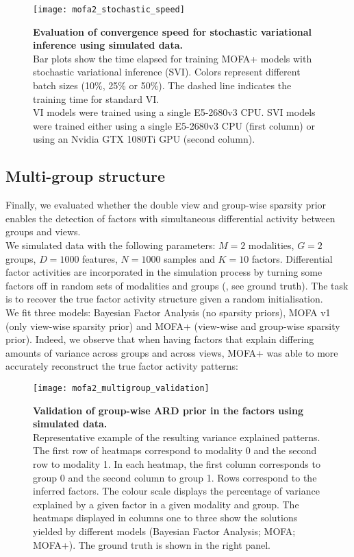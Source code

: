 \begin{figure}[H]
	\centering
	\texttt{[image: mofa2\_stochastic\_speed]}
	\caption[]{
	\textbf{Evaluation of convergence speed for stochastic variational inference using simulated data.} \\
	Bar plots show the time elapsed for training MOFA+ models with  stochastic variational inference (SVI). Colors represent different batch sizes (10\%, 25\% or 50\%). The dashed line indicates the training time for standard VI.\\
	VI models were trained using a single E5-2680v3 CPU. SVI models were trained either using a single E5-2680v3 CPU (first column) or using an Nvidia GTX 1080Ti GPU (second column). 
	}
	\label{fig:mofa2_stochastic_speed}
\end{figure}



\subsection{Multi-group structure}

Finally, we evaluated whether the double view and group-wise sparsity prior enables the detection of factors with simultaneous differential activity between groups and views.\\
We simulated data with the following parameters: $M=2$ modalities, $G=2$ groups, $D=1000$ features, $N=1000$ samples and $K=10$ factors. Differential factor activities are incorporated in the simulation process by turning some factors off in random sets of modalities and groups (, see ground truth). The task is to recover the true factor activity structure given a random initialisation.\\
We fit three models: Bayesian Factor Analysis (no sparsity priors), MOFA v1 (only view-wise sparsity prior) and MOFA+ (view-wise and group-wise sparsity prior). 
Indeed, we observe that when having factors that explain differing amounts of variance across groups and across views, MOFA+ was able to more accurately reconstruct the true factor activity patterns:

\begin{figure}[H]
	\centering
	\texttt{[image: mofa2\_multigroup\_validation]}
	\caption[]{
	\textbf{Validation of group-wise ARD prior in the factors using simulated data.} \\
	Representative example of the resulting variance explained patterns. The first row of heatmaps correspond to modality 0 and the second row to modality 1. In each heatmap, the first column corresponds to group 0 and the second column to group 1. Rows correspond to the inferred factors. The colour scale displays the percentage of variance explained by a given factor in a given modality and group. The heatmaps displayed in columns one to three show the solutions yielded by different models (Bayesian Factor Analysis; MOFA; MOFA+). The ground truth is shown in the right panel. 
	}
	\label{fig:mofa2_multigroup_validation}
\end{figure}



